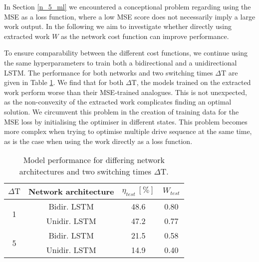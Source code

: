 In Section \ref{n_5_ml} we encountered a conceptional problem regarding using the MSE as a loss function, where a low MSE score does not necessarily imply a large work output.
In the following we aim to investigate whether directly using extracted work $W$ as the network cost function can improve performance.

To ensure comparability between the different cost functions, we continue using the same hyperparameters to train both a bidirectional and a unidirectional LSTM.
The performance for both networks and two switching times $\Delta \mathrm{T}$ are given in Table \ref{workcosttable}.
We find that for both $\Delta \mathrm{T}$, the models trained on the extracted work perform worse than their MSE-trained analogues.
This is not unexpected, as the non-convexity of the extracted work complicates finding an optimal solution.
We circumvent this problem in the creation of training data for the MSE loss by initialising the optimiser in different states.
This problem becomes more complex when trying to optimise multiple drive sequence at the same time, as is the case when using the work directly as a loss function.

\begin{table}[h]
	\centering
	\begin{tabular}{c | c | c | c }
		$\Delta \mathrm{T}$ & Network architecture        & $\eta_{test} \ [\%]$ & $W_{test}$ \\
		\hline
		\multirow{2}{*}{1}  & Bidir. LSTM                 &    48.6              & 0.80  \\
		                    & Unidir. LSTM                &    47.2              & 0.77  \\
		\hline
		\multirow{2}{*}{5}  & Bidir. LSTM                 &    21.5              & 0.58  \\
		                    & Unidir. LSTM                &    14.9              & 0.40  \\
	\end{tabular}
	\caption{Model performance for differing network architectures and two switching times $\Delta \mathrm{T}$.}
	\label{workcosttable}
\end{table}